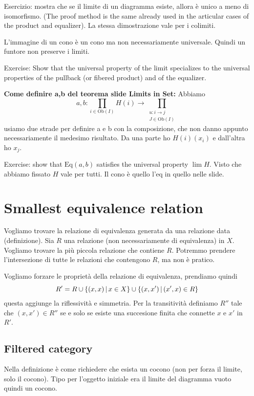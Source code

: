 \documentclass[a4paper]{article}
\begin{document}
Esercizio: mostra che se il limite di un diagramma esiste, allora è unico a meno di isomorfismo.
(The proof method is the same already used in the articular cases of the product and equalizer).
La stessa dimostrazione vale per i colimiti.

L'immagine di un cono è un cono ma non necessariamente universale.
Quindi un funtore non preserve i limiti.

Exercise: Show that the universal property of the limit specializes
to the universal properties of the pullback (or fibered product) and of the equalizer.

\textbf{Come definire a,b del teorema slide Limits in Set:}
Abbiamo
\[
    a,b \colon \prod_{i \in \text{Ob}(I)} H(i)
    \to \prod_{\substack{u \colon i \to j \\ J \in \text{Ob}(I)}}
\]
usiamo due strade per definire a e b con la composizione, che non danno appunto necessariamente
il medesimo risultato. Da una parte ho \(H(i)(x_i)\) e dall'altra ho \(x_j\).

Exercise: show that \(\text{Eq}(a,b)\) satisfies
the universal property \(\lim H\).
Visto che abbiamo fissato \(H\) vale per tutti.
Il cono è quello l'eq in quello nelle slide.

\section{Smallest equivalence relation}

Vogliamo trovare la relazione di equivalenza
generata da una relazione data (definizione).
Sia \(R\) una relazione (non necessariamente di equivalenza) in \(X\).
Vogliamo trovare la più piccola relazione che contiene \(R\).
Potremmo prendere l'intersezione di tutte le relazioni che
contengono \(R\), ma non è pratico.

Vogliamo forzare le proprietà della relazione di equivalenza, prendiamo quindi
\[
    R' = R \cup \{(x,x) \,|\, x\in X\}
    \cup \{(x,x') \,|\, (x', x) \in R\}
\]
questa aggiunge la riflessività e simmetria.
Per la transitività definiamo
\(R''\) tale che \((x, x') \in R''\)
se e solo se esiste una succesione finita che connette \(x\) e \(x'\)
in \(R'\).

\subsection{Filtered category}

Nella definizione è come richiedere che esista un cocono (non per forza il limite, solo il cocono).
Tipo per l'oggetto iniziale era il limite del diagramma vuoto quindi un cocono.
\end{document}

